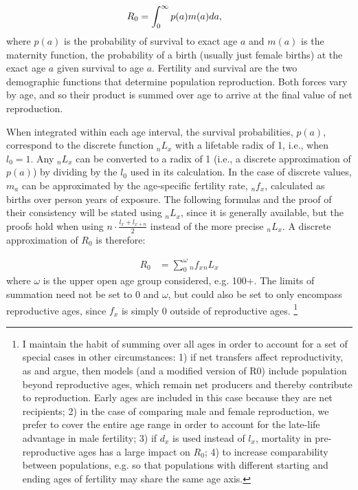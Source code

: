 \documentclass{article}
\begin{document}
\begin{align}
R_{0} &= \int_{0}^{\infty}p(a)m(a)da \notag \text{,}
\end{align}
where $p(a)$ is the probability of survival to exact age $a$ and $m(a)$ is the
maternity function, the probability of a birth (usually just female births) at
the exact age $a$ given survival to age $a$. Fertility and survival are the two
demographic functions that determine population reproduction. Both forces vary
by age, and so their product is summed over age to arrive at the final value of
net reproduction. 

When integrated within each age interval, the survival probabilities, $p(a)$,
correspond to the discrete function ${}_{n}L_{x}$ with a lifetable radix of 1,
i.e., when $l_{0} = 1$. Any ${}_{n}L_{x}$ can be converted to a radix of 1 (i.e.,
a discrete approximation of $p(a)$) by dividing by the $l_{0}$ used in its calculation. In
the case of discrete values, $m_{a}$ can be approximated by the age-specific
fertility rate, ${}_{n}f_{x}$, calculated as births over person years of exposure.
The following formulas and the proof of their consistency will be stated using
${}_{n}L_{x}$, since it is generally available, but the proofs hold when using
$n\cdot\frac{l_{x}+l_{x+n}}{2}$ instead of the more precise ${}_{n}L_{x}$. A
discrete approximation of $R_{0}$ is therefore:

\begin{align}
R_{0} &= \sum_{0}^{\omega} {}_{n}f_{x} {}_{n}L_{x} \label{eq1}
\end{align}
where $\omega$ is the upper open age group considered, e.g. 100+. The limits of summation need not be set to $0$ and $\omega$, but could also be set to only encompass reproductive ages, since $f_{x}$ is simply 0 outside of reproductive ages. \footnote{I maintain the habit of summing over all ages in order to account for a set of special cases in other circumstances: 1) if net transfers affect reproductivity, as \citet{lee2003rethinking} and \citet{kaplan2003embodied} argue, then models (and a modified version of R0) include population beyond reproductive ages, which remain net producers and thereby contribute to reproduction. Early ages are included in this case because they are net recipients; 2) in the case of comparing male and female reproduction, we prefer to cover the entire age range in order to account for the late-life advantage in male fertility; 3) if $d_{x}$ is used instead of $l_{x}$, mortality in pre-reproductive ages has a large impact on $R_{0}$; 4) to increase comparability between populations, e.g. so that populations with different starting and ending ages of fertility may share the same age axis.}
\end{document}
